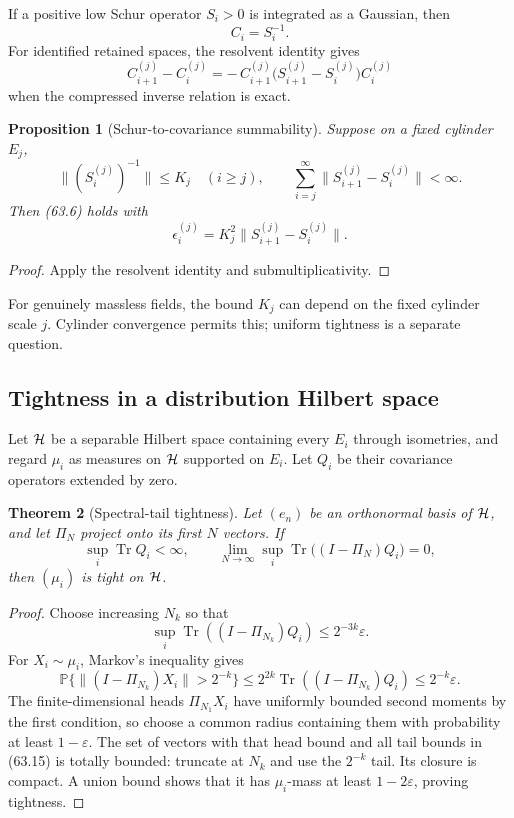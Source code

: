 \documentclass[11pt]{article}
\newtheorem{theorem}{Theorem}[section]
\newtheorem{proposition}[theorem]{Proposition}
\begin{document}
If a positive low Schur operator \(S_i>0\) is integrated as a Gaussian,
then
\[
                              C_i=S_i^{-1}.                    \tag{63.10}
\]
For identified retained spaces, the resolvent identity gives
\[
 C_{i+1}^{(j)}-C_i^{(j)}
 =-\,C_{i+1}^{(j)}
       \bigl(S_{i+1}^{(j)}-S_i^{(j)}\bigr)C_i^{(j)}            \tag{63.11}
\]
when the compressed inverse relation is exact.

\begin{proposition}[Schur-to-covariance summability]
\label{prop:v11v63-resolvent}
Suppose on a fixed cylinder \(E_j\),
\[
 \lVert (S_i^{(j)})^{-1}\rVert\le K_j
 \quad(i\ge j),\qquad
 \sum_{i=j}^{\infty}
     \lVert S_{i+1}^{(j)}-S_i^{(j)}\rVert<\infty.             \tag{63.12}
\]
Then (63.6) holds with
\[
 \epsilon_i^{(j)}
 =K_j^2\lVert S_{i+1}^{(j)}-S_i^{(j)}\rVert.                 \tag{63.13}
\]
\end{proposition}

\begin{proof}
Apply the resolvent identity and submultiplicativity.
\end{proof}

For genuinely massless fields, the bound \(K_j\) can depend on the
fixed cylinder scale \(j\).  Cylinder convergence permits this;
uniform tightness is a separate question.

\subsection{Tightness in a distribution Hilbert space}

Let \({\cal H}\) be a separable Hilbert space containing every \(E_i\)
through isometries, and regard \(\mu_i\) as measures on \({\cal H}\)
supported on \(E_i\).  Let \(Q_i\) be their covariance operators
extended by zero.

\begin{theorem}[Spectral-tail tightness]
\label{thm:v11v63-tight}
Let \((e_n)\) be an orthonormal basis of \({\cal H}\), and let
\(\Pi_N\) project onto its first \(N\) vectors.  If
\[
 \sup_i\operatorname{Tr}Q_i<\infty,\qquad
 \lim_{N\to\infty}\sup_i
       \operatorname{Tr}\bigl((I-\Pi_N)Q_i\bigr)=0,           \tag{63.14}
\]
then \((\mu_i)\) is tight on \({\cal H}\).
\end{theorem}

\begin{proof}
Choose increasing \(N_k\) so that
\[
 \sup_i\operatorname{Tr}((I-\Pi_{N_k})Q_i)
                         \le 2^{-3k}\varepsilon.
\]
For \(X_i\sim\mu_i\), Markov's inequality gives
\[
 \mathbb P\{\lVert(I-\Pi_{N_k})X_i\rVert>2^{-k}\}
 \le2^{2k}\operatorname{Tr}((I-\Pi_{N_k})Q_i)
 \le2^{-k}\varepsilon.                                      \tag{63.15}
\]
The finite-dimensional heads \(\Pi_{N_1}X_i\) have uniformly bounded
second moments by the first condition, so choose a common radius
containing them with probability at least \(1-\varepsilon\).
The set of vectors with that head bound and all tail bounds in
(63.15) is totally bounded: truncate at \(N_k\) and use the
\(2^{-k}\) tail.  Its closure is compact.  A union bound shows that it
has \(\mu_i\)-mass at least \(1-2\varepsilon\), proving tightness.
\end{proof}
\end{document}
